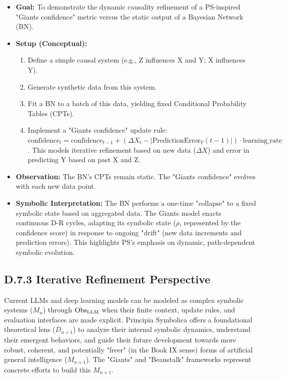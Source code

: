 \begin{itemize}
    \item \textbf{Goal:} To demonstrate the dynamic causality refinement of a PS-inspired "Giants confidence" metric versus the static output of a Bayesian Network (BN).
    \item \textbf{Setup (Conceptual):}
        \begin{enumerate}
            \item Define a simple causal system (e.g., Z influences X and Y; X influences Y).
            \item Generate synthetic data from this system.
            \item Fit a BN to a batch of this data, yielding fixed Conditional Probability Tables (CPTs).
            \item Implement a "Giants confidence" update rule: \( \text{confidence}_{t} = \text{confidence}_{t-1} + (\Delta X_t - |\text{PredictionError}_Y(t-1)|) \cdot \text{learning\_rate} \). This models iterative refinement based on new data (\(\Delta X\)) and error in predicting Y based on past X and Z.
        \end{enumerate}
    \item \textbf{Observation:} The BN's CPTs remain static. The "Giants confidence" evolves with each new data point.
    \item \textbf{Symbolic Interpretation:} The BN performs a one-time "collapse" to a fixed symbolic state based on aggregated data. The Giants model enacts continuous D-R cycles, adapting its symbolic state (\(\rho\), represented by the confidence score) in response to ongoing "drift" (new data increments and prediction errors). This highlights PS's emphasis on dynamic, path-dependent symbolic evolution.
\end{itemize}
\subsection*{D.7.3 Iterative Refinement Perspective}
\label{subsec:appD_ai_iterative_refinement_perspective}
Current LLMs and deep learning models can be modeled as complex symbolic systems (\(M_n\)) through \(\mathrm{Obs}_{\mathrm{LLM}}\) when their finite context, update rules, and evaluation interfaces are made explicit. Principia Symbolica offers a foundational theoretical lens (\(D_{n+1}\)) to analyze their internal symbolic dynamics, understand their emergent behaviors, and guide their future development towards more robust, coherent, and potentially "freer" (in the Book IX sense) forms of artificial general intelligence (\(M_{n+1}\)). The "Giants" and "Beanstalk" frameworks represent concrete efforts to build this \(M_{n+1}\).
